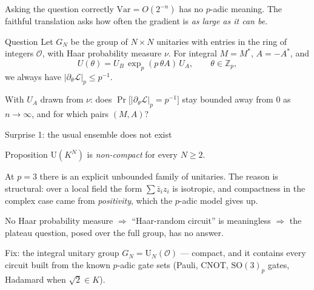 \documentclass[aspectratio=169,10pt]{beamer}
\newcommand{\Zp}{\mathbb{Z}_p}
\newcommand{\OK}{\mathcal{O}}
\newcommand{\Uni}{\mathrm{U}}
\newcommand{\loss}{\mathcal{L}}
\newcommand{\padicnorm}[1]{\left|#1\right|_p}
\begin{document}
\begin{frame}{Asking the question correctly}
  $\mathrm{Var}=O(2^{-n})$ has no $p$-adic meaning. The faithful translation
  asks how often the gradient is \emph{as large as it can be}.

  \begin{block}{Question}
    Let $G_N$ be the group of $N\times N$ unitaries with entries in the ring of
    integers $\OK$, with Haar probability measure $\nu$. For integral $M=M^*$,
    $A=-A^*$, and
    \[
      U(\theta)=U_B\,\exp_p(p\,\theta A)\,U_A ,
      \qquad \theta\in\Zp ,
    \]
    we always have $\padicnorm{\partial_\theta\loss}\le p^{-1}$.
    \medskip

    With $U_A$ drawn from $\nu$: does
    $\Pr\bigl[\padicnorm{\partial_\theta\loss}=p^{-1}\bigr]$ stay bounded away
    from $0$ as $n\to\infty$, and for which pairs $(M,A)$?
  \end{block}
\end{frame}

\begin{frame}{Surprise 1: the usual ensemble does not exist}
  \begin{alertblock}{Proposition}
    $\Uni(K^{N})$ is \emph{non-compact} for every $N\ge2$.
  \end{alertblock}

  At $p=3$ there is an explicit unbounded family of unitaries. The reason is
  structural: over a local field the form $\sum\bar z_iz_i$ is isotropic, and
  compactness in the complex case came from \emph{positivity}, which the
  $p$-adic model gives up.

  \vspace{0.5em}
  No Haar probability measure $\Rightarrow$ ``Haar-random circuit'' is
  meaningless $\Rightarrow$ the plateau question, posed over the full group,
  has no answer.

  \vspace{0.5em}
  \alert{Fix:} the integral unitary group $G_N=\Uni_N(\OK)$ --- compact, and it
  contains every circuit built from the known $p$-adic gate sets (Pauli, CNOT,
  $\mathrm{SO}(3)_p$ gates, Hadamard when $\sqrt2\in K$).
\end{frame}
\end{document}
